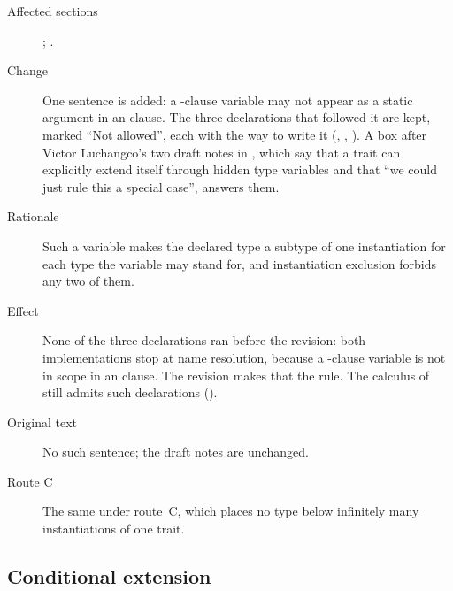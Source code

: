 \begin{description}
\item[Affected sections] ; .
\item[Change] One sentence is added: a -clause variable may not
appear as a static argument in an  clause.
The three declarations that followed it are kept, marked
``Not allowed'', each with the way to write it
(, ,
).
A box after Victor Luchangco's two draft notes in ,
which say that a trait can explicitly extend itself through hidden type
variables and that ``we could just rule this a special case'', answers
them.
\item[Rationale] Such a variable makes the declared type a subtype of one
instantiation for each type the variable may stand for, and instantiation
exclusion forbids any two of them.
\item[Effect] None of the three declarations ran before the revision:
both implementations stop at name resolution, because a
-clause variable is not in scope in an  clause.
The revision makes that the rule.
The calculus of  still admits such
declarations ().
\item[Original text] No such sentence; the draft notes are unchanged.
\item[Route C] The same under route~C, which places no type below
infinitely many instantiations of one trait.
\end{description}

\subsection{Conditional extension}

